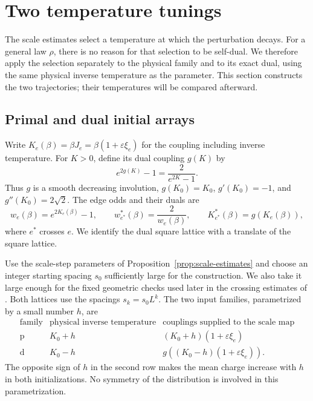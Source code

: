 \section{Two temperature tunings}
\label{sec:tuning}

The scale estimates select a temperature at which the perturbation
decays.  For a general law \(\rho\), there is no reason for that selection
to be self-dual.  We therefore apply the selection separately to the
physical family and to its exact dual, using the same physical inverse
temperature as the parameter.  This section constructs the two
trajectories; their temperatures will be compared afterward.

\subsection{Primal and dual initial arrays}

Write \(K_e(\beta)=\beta J_e=\beta(1+\varepsilon\xi_e)\) for the
coupling including inverse temperature.  For \(K>0\), define its dual
coupling \(g(K)\) by
\begin{equation}
 e^{2g(K)}-1=\frac{2}{e^{2K}-1}.
 \label{eq:dual-coupling}
\end{equation}
Thus \(g\) is a smooth decreasing involution, \(g(K_0)=K_0\),
\(g'(K_0)=-1\), and \(g''(K_0)=2\sqrt2\).
The edge odds and their duals are
\[
 w_e(\beta)=e^{2K_e(\beta)}-1,
 \qquad w^*_{e^*}(\beta)=\frac2{w_e(\beta)},
 \qquad K^*_{e^*}(\beta)=g(K_e(\beta)),
\]
where \(e^*\) crosses \(e\).  We identify the dual square lattice with
a translate of the square lattice.

Use the scale-step parameters of Proposition~\ref{prop:scale-estimates}
and choose an integer starting spacing \(s_0\) sufficiently large for
the construction.  We also take it large enough for the fixed geometric
checks used later in the crossing estimates of \cite[Section~7]{R}.
Both lattices use the spacings
\(s_k=s_0L^k\).  The two input families, parametrized by a small
number \(h\), are
\begin{equation}
 \begin{array}{c|c|c}
  \text{family}&\text{physical inverse temperature}
       &\text{couplings supplied to the scale map}\\ \hline
  \mathrm p&K_0+h&(K_0+h)(1+\varepsilon\xi_e)\\
  \mathrm d&K_0-h&g((K_0-h)(1+\varepsilon\xi_e)).
 \end{array}
 \label{eq:two-input-families}
\end{equation}
The opposite sign of \(h\) in the second row makes the mean charge
increase with \(h\) in both initializations.  No symmetry of the
distribution is involved in this parametrization.

